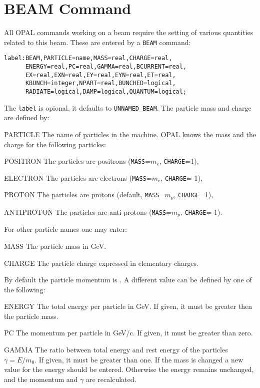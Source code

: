 \section{BEAM Command}
\label{sec:beam}
All OPAL commands working on a beam require the setting of various
quantities related to this beam. 
These are entered by a \texttt{BEAM} command:
\begin{verbatim}
label:BEAM,PARTICLE=name,MASS=real,CHARGE=real,
      ENERGY=real,PC=real,GAMMA=real,BCURRENT=real,
      EX=real,EXN=real,EY=real,EYN=real,ET=real,
      KBUNCH=integer,NPART=real,BUNCHED=logical,
      RADIATE=logical,DAMP=logical,QUANTUM=logical;
\end{verbatim}
The \texttt{label} is opional, it defaults to \texttt{UNNAMED\_BEAM}.
The particle mass and charge are defined by:
\begin{description}
\item{PARTICLE}
  The name of particles in the machine.
  OPAL knows the mass and the charge for the following particles:
  \begin{description}
  \item{POSITRON}
    The particles are positrons (\texttt{MASS}=$m_e$,
    \texttt{CHARGE}=1),
  \item{ELECTRON}
    The particles are electrons (\texttt{MASS}=$m_e$,
    \texttt{CHARGE}=-1),
  \item{PROTON}
    The particles are protons (default, \texttt{MASS}=$m_p$,
    \texttt{CHARGE}=1),
  \item{ANTIPROTON}
    The particles are anti-protons (\texttt{MASS}=$m_p$,
    \texttt{CHARGE}=-1).
  \end{description}
\end{description}
For other particle names one may enter:
\begin{description}
\item{MASS}
  The particle mass in GeV.
\item{CHARGE}
  The particle charge expressed in elementary charges.
\end{description}
By default the particle momentum is .
A different value can be defined by one of the following:
\begin{description}
\item{ENERGY}
  The total energy per particle in GeV.
  If given, it must be greater then the particle mass.
\item{PC}
  The momentum per particle in GeV/c.
  If given, it must be greater than zero.
\item{GAMMA}
  The ratio between total energy and rest energy of the particles
  $\gamma = E / m_0$.
  If given, it must be greater than one.
  If the mass is changed a new value for the energy should be entered.
  Otherwise the energy remains unchanged,
  and the momentum and $\gamma$ are recalculated.
\end{description}
